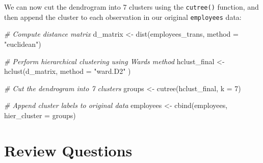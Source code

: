 \documentclass[
]{book}
\newenvironment{Shaded}{\begin{snugshade}}{\end{snugshade}}
\newcommand{\AttributeTok}[1]{\textcolor[rgb]{0.77,0.63,0.00}{#1}}
\newcommand{\CommentTok}[1]{\textcolor[rgb]{0.56,0.35,0.01}{\textit{#1}}}
\newcommand{\DecValTok}[1]{\textcolor[rgb]{0.00,0.00,0.81}{#1}}
\newcommand{\FunctionTok}[1]{\textcolor[rgb]{0.00,0.00,0.00}{#1}}
\newcommand{\NormalTok}[1]{#1}
\newcommand{\OtherTok}[1]{\textcolor[rgb]{0.56,0.35,0.01}{#1}}
\newcommand{\StringTok}[1]{\textcolor[rgb]{0.31,0.60,0.02}{#1}}
\begin{document}
We can now cut the dendrogram into 7 clusters using the \texttt{cutree()} function, and then append the cluster to each observation in our original \texttt{employees} data:

\begin{Shaded}
\begin{Highlighting}[]
\CommentTok{\# Compute distance matrix}
\NormalTok{d\_matrix }\OtherTok{\textless{}{-}} \FunctionTok{dist}\NormalTok{(employees\_trans, }\AttributeTok{method =} \StringTok{"euclidean"}\NormalTok{)}

\CommentTok{\# Perform hierarchical clustering using Ward\textquotesingle{}s method}
\NormalTok{hclust\_final }\OtherTok{\textless{}{-}} \FunctionTok{hclust}\NormalTok{(d\_matrix, }\AttributeTok{method =} \StringTok{"ward.D2"}\NormalTok{ )}

\CommentTok{\# Cut the dendrogram into 7 clusters}
\NormalTok{groups }\OtherTok{\textless{}{-}} \FunctionTok{cutree}\NormalTok{(hclust\_final, }\AttributeTok{k =} \DecValTok{7}\NormalTok{)}

\CommentTok{\# Append cluster labels to original data}
\NormalTok{employees }\OtherTok{\textless{}{-}} \FunctionTok{cbind}\NormalTok{(employees, }\AttributeTok{hier\_cluster =}\NormalTok{ groups)}
\end{Highlighting}
\end{Shaded}

\hypertarget{review-questions-12}{%
\section{Review Questions}\label{review-questions-12}}
\end{document}

